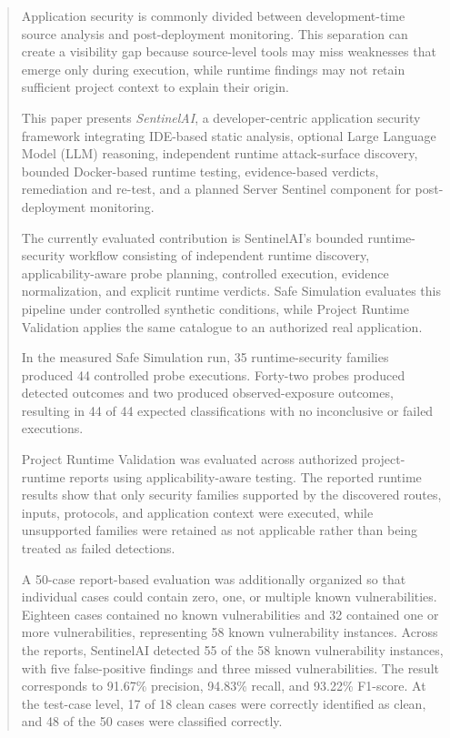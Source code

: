 \documentclass[journal]{IEEEtran}
\begin{document}
\begin{abstract}

Application security is commonly divided between development-time source
analysis and post-deployment monitoring. This separation can create a
visibility gap because source-level tools may miss weaknesses that emerge
only during execution, while runtime findings may not retain sufficient
project context to explain their origin.

This paper presents \textit{SentinelAI}, a developer-centric application
security framework integrating IDE-based static analysis, optional Large
Language Model (LLM) reasoning, independent runtime attack-surface discovery,
bounded Docker-based runtime testing, evidence-based verdicts, remediation
and re-test, and a planned Server Sentinel component for post-deployment
monitoring.

The currently evaluated contribution is SentinelAI's bounded runtime-security
workflow consisting of independent runtime discovery, applicability-aware
probe planning, controlled execution, evidence normalization, and explicit
runtime verdicts. Safe Simulation evaluates this pipeline under controlled
synthetic conditions, while Project Runtime Validation applies the same
catalogue to an authorized real application.

In the measured Safe Simulation run, 35 runtime-security families produced
44 controlled probe executions. Forty-two probes produced detected outcomes
and two produced observed-exposure outcomes, resulting in 44 of 44 expected
classifications with no inconclusive or failed executions.

Project Runtime Validation was evaluated across authorized project-runtime
reports using applicability-aware testing. The reported runtime results show
that only security families supported by the discovered routes, inputs,
protocols, and application context were executed, while unsupported families
were retained as not applicable rather than being treated as failed
detections.

A 50-case report-based evaluation was additionally organized so that
individual cases could contain zero, one, or multiple known vulnerabilities.
Eighteen cases contained no known vulnerabilities and 32 contained one or
more vulnerabilities, representing 58 known vulnerability instances. Across
the reports, SentinelAI detected 55 of the 58 known vulnerability instances,
with five false-positive findings and three missed vulnerabilities. The
result corresponds to 91.67\% precision, 94.83\% recall, and 93.22\%
F1-score. At the test-case level, 17 of 18 clean cases were correctly
identified as clean, and 48 of the 50 cases were classified correctly.

\end{abstract}
\end{document}
